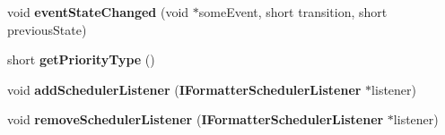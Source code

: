 \begin{CompactItemize}
\item 
void \textbf{eventStateChanged} (void $\ast$someEvent, short transition, short previousState)\label{classbr_1_1pucrio_1_1telemidia_1_1ginga_1_1ncl_1_1FormatterScheduler_e3c1ec29e93bffe641750e6209a8b2b8}

\item 
short \textbf{getPriorityType} ()\label{classbr_1_1pucrio_1_1telemidia_1_1ginga_1_1ncl_1_1FormatterScheduler_ae7d2f7d0ac4466813deee19bbea7ebe}

\item 
void \textbf{addSchedulerListener} ({\bf IFormatterSchedulerListener} $\ast$listener)\label{classbr_1_1pucrio_1_1telemidia_1_1ginga_1_1ncl_1_1FormatterScheduler_28f74053852556d44977be918461c194}

\item 
void \textbf{removeSchedulerListener} ({\bf IFormatterSchedulerListener} $\ast$listener)\label{classbr_1_1pucrio_1_1telemidia_1_1ginga_1_1ncl_1_1FormatterScheduler_e99d0f7c4fdc6aaadfa655ee653a6a06}

\end{CompactItemize}
